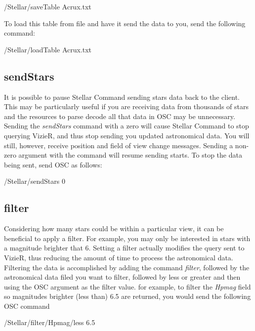  \begin{syntax}	
 	\medskip
 	/Stellar/saveTable Acrux.txt
 	\medskip
 \end{syntax}

To load this table from file and have it send the data to you, send the following command:
 \begin{syntax}	
	\medskip
	/Stellar/loadTable Acrux.txt
	\medskip
\end{syntax}

\subsection{sendStars} 
It is possible to pause Stellar Command sending stars data back to the client. This may be particularly useful if you are receiving data from thousands of stars and the resources to parse decode all that data in OSC may be unnecessary. Sending the \textit{sendStars} command with a zero will cause Stellar Command to stop querying VizieR, and thus stop sending you updated astronomical data. You will still, however, receive position and field of view change messages. Sending a non-zero argument with the command will resume sending starts. To stop the data being sent, send OSC as follows:

 \begin{syntax}	
	\medskip
	/Stellar/sendStars 0
	\medskip
\end{syntax}  

\subsection{filter}   
Considering how many stars could be within a particular view, it can be beneficial to apply a filter.  For example, you may only be interested in stars with a magnitude brighter that 6. Setting a filter actually modifies the query sent to VizieR, thus reducing the amount of time to process the astronomical data.
Filtering the data is accomplished by adding the command \textit{filter}, followed by the astronomical data filed you want to filter, followed by less or greater and then using the OSC argument as the filter value.  for example, to filter the \textit{Hpmag} field so magnitudes brighter (less than) 6.5 are returned, you would send the following OSC command
   
    \begin{syntax}	   
   	\medskip
   	/Stellar/filter/Hpmag/less 6.5
   	\medskip
   \end{syntax}  

